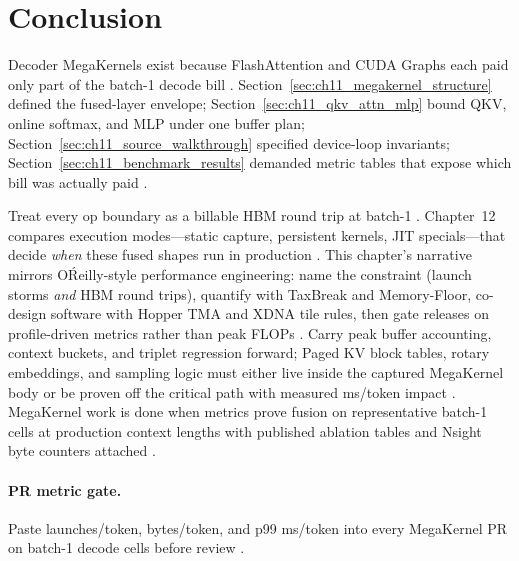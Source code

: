\section{Conclusion}
\label{sec:ch11_conclusion}

Decoder MegaKernels exist because FlashAttention and CUDA Graphs each paid only part of the batch-1 decode bill \citep{dao2022flashattention,memoryfloor2026,taxbreak2026}. Section~\ref{sec:ch11_megakernel_structure} defined the fused-layer envelope; Section~\ref{sec:ch11_qkv_attn_mlp} bound QKV, online softmax, and MLP under one buffer plan; Section~\ref{sec:ch11_source_walkthrough} specified device-loop invariants; Section~\ref{sec:ch11_benchmark_results} demanded metric tables that expose which bill was actually paid \citep{yirage2026,chen2020compilerbasedhardw,patel2025llminference}.

Treat every op boundary as a billable HBM round trip at batch-1 \citep{memoryfloor2026,dlbook}. Chapter~12 compares execution modes---static capture, persistent kernels, JIT specials---that decide \emph{when} these fused shapes run in production \citep{nvidia2024cudagraphs,kwon2023vllm,liu2024deepseekv3}. This chapter's narrative mirrors O\'Reilly-style performance engineering: name the constraint (launch storms \emph{and} HBM round trips), quantify with TaxBreak and Memory-Floor, co-design software with Hopper TMA and XDNA tile rules, then gate releases on profile-driven metrics rather than peak FLOPs \citep{taxbreak2026,memoryfloor2026,patel2025llminference,semianalysis2024tma,amd2024aie,yirage2026,chen2020compilerbasedhardw,liu2024deepseekv3,kwon2023vllm,nvidia2024cudagraphs,dao2022flashattention,dao2023flashdecoding,dlbook,amd2024xdna,nvidia2022hopper}. Carry peak buffer accounting, context buckets, and triplet regression forward; Paged KV block tables, rotary embeddings, and sampling logic must either live inside the captured MegaKernel body or be proven off the critical path with measured ms/token impact \citep{kwon2023vllm,patel2025llminference,dao2023flashdecoding,taxbreak2026,memoryfloor2026,yirage2026,chen2020compilerbasedhardw,liu2024deepseekv3,nvidia2024cudagraphs,amd2024aie,semianalysis2024tma,dao2022flashattention,dlbook,amd2024xdna,nvidia2022hopper}. MegaKernel work is done when metrics prove fusion on representative batch-1 cells at production context lengths with published ablation tables and Nsight byte counters attached \citep{taxbreak2026,yirage2026,amd2024aie}.

\paragraph{PR metric gate.} Paste launches/token, bytes/token, and p99 ms/token into every MegaKernel PR on batch-1 decode cells before review \citep{taxbreak2026,memoryfloor2026,patel2025llminference,yirage2026,chen2020compilerbasedhardw,liu2024deepseekv3,kwon2023vllm,nvidia2024cudagraphs,amd2024aie,semianalysis2024tma,dao2022flashattention,dao2023flashdecoding,dlbook,amd2024xdna,nvidia2022hopper}.

